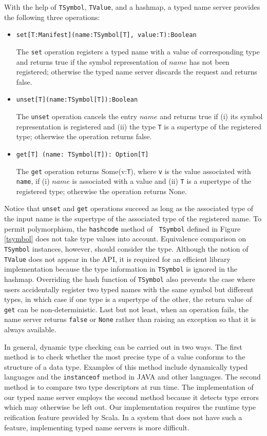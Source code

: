 With the help of {\tt TSymbol}, {\tt TValue}, and a hashmap, a typed name 
server provides the following three operations:
\begin{itemize}
  \item {\tt set[T:Manifest](name:TSymbol[T], value:T):Boolean}

The {\tt set} operation registers a typed name with a value of corresponding 
type and returns true if the symbol representation of $name$ has not been
registered; otherwise the typed name server discards the request and
returns false.


  \item {\tt unset[T](name:TSymbol[T]):Boolean}

The {\tt unset} operation cancels the entry $name$ and returns true if (i) its 
symbol representation is registered and (ii) the type {\tt T} is a supertype of 
the registered type; otherwise the operation returns false.

  \item {\tt get[T] (name: TSymbol[T]): Option[T]}

The {\tt get} operation returns Some(v:{\tt T}), where {\tt v} is the value 
associated with {\tt name}, if (i) $name$ is associated with a value and (ii) 
{\tt T} is a supertype of the registered type; otherwise the operation returns 
None.
\end{itemize}

Notice that {\tt unset} and {\tt get} operations succeed as long as the 
associated type of the input name is the supertype of the associated type of 
the registered name.  To permit polymorphism, the {\tt hashcode} method of {\tt 
TSymbol} defined in  Figure {\ref{tsymbol}} does not take type values into 
account.  Equivalence comparison on {\tt TSymbol} instances, however, should 
consider the type.  Although the notion of {\tt TValue} does not appear in the
API, it is required for an efficient library implementation because the type 
information in {\tt TSymbol} is ignored in the hashmap.  Overriding the
hash function of {\tt TSymbol} also prevents the case where users accidentally
register two typed names with the same symbol but different types,
in which case if one type is a supertype of the other, the return value of
{\tt get} can be non-deterministic.  Last but not least, when an operation 
fails, the name server returns {\tt false} or {\tt None} rather than raising an
exception so that it is always available.

In general, dynamic type checking can be carried out in two ways.  The first 
method is to check whether the most precise type of a value conforms to the
structure of a data type.  Examples of this method include dynamically typed
languages and the {\tt instanceof} method in JAVA and other languages.  The
second method is to compare two type descriptors at run time.  The
implementation of our typed name server employs the second method because  
it detects type errors which may otherwise be left out.  Our
implementation requires the runtime type reification feature provided by Scala.
In a system that does not have such a feature, implementing typed name servers
is more difficult.


